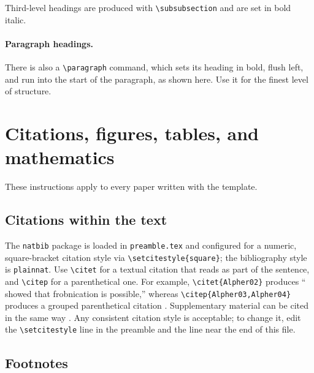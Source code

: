 \documentclass[11pt,letterpaper,logo]{yalearxiv}
\begin{document}
Third-level headings are produced with \verb+\subsubsection+ and are set in bold
italic.

\paragraph{Paragraph headings.}
There is also a \verb+\paragraph+ command, which sets its heading in bold, flush
left, and run into the start of the paragraph, as shown here. Use it for the
finest level of structure.


\section{Citations, figures, tables, and mathematics}
\label{sec:others}

These instructions apply to every paper written with the template.

\subsection{Citations within the text}
\label{sec:citations}

The \verb+natbib+ package is loaded in \verb+preamble.tex+ and configured for a
numeric, square-bracket citation style via \verb+\setcitestyle{square}+; the
bibliography style is \verb+plainnat+. Use \verb+\citet+ for a textual citation
that reads as part of the sentence, and \verb+\citep+ for a parenthetical one.
For example, \verb+\citet{Alpher02}+ produces ``\citet{Alpher02} showed that
frobnication is possible,'' whereas \verb+\citep{Alpher03,Alpher04}+ produces a
grouped parenthetical citation \citep{Alpher03,Alpher04}. Supplementary material
can be cited in the same way \citep{Authors14}. Any consistent citation style is
acceptable; to change it, edit the \verb+\setcitestyle+ line in the preamble and
the \verb++ line near the end of this file.

\subsection{Footnotes}
\label{sec:footnotes}
\end{document}

